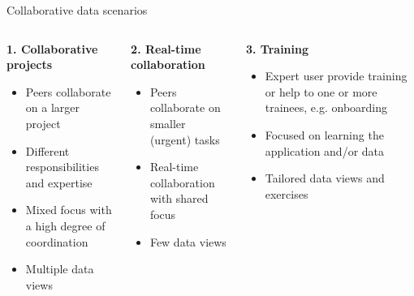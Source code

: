 \documentclass[aspectratio=169]{beamer}
\begin{document}

\begin{frame}{Collaborative data scenarios}
    \setlength{\leftmargini}{0.5cm}
    \begin{columns}[t]
        \begin{column}{0.3\textwidth}
            \textbf{1. Collaborative projects}
            \begin{itemize}
                \scriptsize
                \item Peers collaborate on a larger project
                \item Different responsibilities and expertise
                \item Mixed focus with a high degree of coordination
                \item Multiple data views
            \end{itemize}
        \end{column}
        \begin{column}{0.33\textwidth}
            \textbf{2. Real-time collaboration}
            \begin{itemize}
                \scriptsize
                \item Peers collaborate on smaller (urgent) tasks
                \item Real-time collaboration with shared focus
                \item Few data views
            \end{itemize}
        \end{column}
        \begin{column}{0.33\textwidth}
            \textbf{3. Training}
            \begin{itemize}
                \scriptsize
                \item Expert user provide training or help to one or more trainees, e.g. onboarding
                \item Focused on learning the application and/or data
                \item Tailored data views and exercises
            \end{itemize}
        \end{column}
    \end{columns}
\end{frame}
\end{document}
